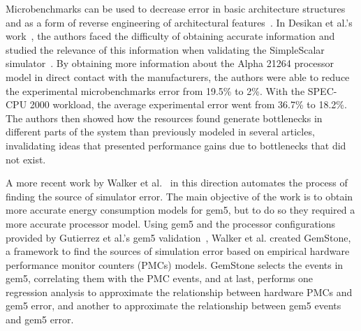 \documentclass[AMA,final,STIX1COL]{WileyNJD-v2}
\newcommand{\ms}[1]{\textcolor{orange}{\bfseries \ul{ msserpa: #1} }\vspace{0.2cm}}
\newcommand{\fbm}[1]{\textcolor{red}{\bfseries \ul{fbm: #1} }\vspace{0.2cm}}
\begin{document}
Microbenchmarks can be used to decrease error in basic architecture structures and as a form of reverse engineering of architectural features~\cite{fog2012microarchitecture}.
In Desikan et al.'s work~\cite{desikan2001measuring}, the authors faced the difficulty of obtaining accurate information and studied the relevance of this information when validating the SimpleScalar simulator~\cite{austin2002simplescalar}. 
By obtaining more information about the Alpha 21264 processor model in direct contact with the manufacturers, the authors were able to reduce the experimental microbenchmarks error from 19.5\% to 2\%.  
With the SPEC-CPU 2000 workload, the average experimental error went from 36.7\% to 18.2\%. 
The authors then showed how the resources found generate bottlenecks in different parts of the system than previously modeled in several articles, invalidating ideas that presented performance gains due to bottlenecks that did not exist.

A more recent work by Walker et al.~\cite{walker2018hardware} in this direction automates the process of finding the source of simulator error.
The main objective of the work is to obtain more accurate energy consumption models for gem5, but to do so they required a more accurate processor model. 
Using gem5 and the processor configurations provided by Gutierrez et al.'s gem5 validation~\cite{gutierrez2014sources}, Walker et al. created GemStone, a framework to find the sources of simulation error based on empirical hardware performance monitor counters (PMCs) models.
GemStone selects the events in gem5, correlating them with the PMC events, and at last, performs one regression analysis to approximate the relationship between hardware PMCs and gem5 error, and another to approximate the relationship between gem5 events and gem5 error.
\end{document}
